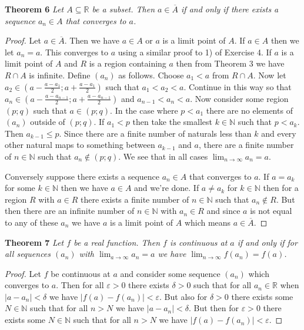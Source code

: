 \documentclass{article}
\begin{document}
\begin{flushleft}
\textbf{Theorem 6}
\textsl{Let $A \subseteq \mathbb{R}$ be a subset. Then $a \in \overline{A}$ if and only if there exists a sequence $a_n \in A$ that converges to $a$.}
\begin{proof}
Let $a \in \overline{A}$. Then we have $a \in A$ or $a$ is a limit point of $A$. If $a \in A$ then we let $a_n = a$. This converges to $a$ using a similar proof to 1) of Exercise 4. If $a$ is a limit point of $A$ and $R$ is a region containing $a$ then from Theorem 3 we have $R \cap A$ is infinite. Define $(a_n)$ as follows. Choose $a_1 < a$ from $R \cap A$. Now let $a_2 \in (a - \frac{a-a_1}{2} ; a + \frac{a - a_1}{2})$ such that $a_1 < a_2 < a$. Continue in this way so that $a_n \in (a - \frac{a-a_{n-1}}{2} ; a + \frac{a-a_{n-1}}{2})$ and $a_{n-1} < a_n < a$. Now consider some region $(p;q)$ such that $a \in (p;q)$. In the case where $p<a_1$ there are no elements of $(a_n)$ outside of $(p;q)$. If $a_1 < p$ then take the smallest $k \in \mathbb{N}$ such that $p<a_k$. Then $a_{k-1} \leq p$. Since there are a finite number of naturals less than $k$ and every other natural maps to something between $a_{k-1}$ and $a$, there are a finite number of $n \in \mathbb{N}$ such that $a_n \notin (p;q)$. We see that in all cases $\lim_{n \rightarrow \infty} a_n = a$.\newline

Conversely suppose there exists a sequence $a_n \in A$ that converges to $a$. If $a=a_k$ for some $k \in \mathbb{N}$ then we have $a \in A$ and we're done. If $a \neq a_k$ for $k \in \mathbb{N}$ then for a region $R$ with $a \in R$ there exists a finite number of $n \in \mathbb{N}$ such that $a_n \notin R$. But then there are an infinite number of $n \in \mathbb{N}$ with $a_n \in R$ and since $a$ is not equal to any of these $a_n$ we have $a$ is a limit point of $A$ which means $a \in \overline{A}$.
\end{proof}

\textbf{Theorem 7}
\textsl{Let $f$ be a real function. Then $f$ is continuous at $a$ if and only if for all sequences $(a_n)$ with $\lim_{a \rightarrow \infty} a_n = a$ we have $\lim_{n \rightarrow \infty} f(a_n) = f(a)$.}
\begin{proof}
Let $f$ be continuous at $a$ and consider some sequence $(a_n)$ which converges to $a$. Then for all $\varepsilon > 0$ there exists $\delta > 0$ such that for all $a_n \in \mathbb{R}$ when $|a-a_n| < \delta$ we have $|f(a) - f(a_n)| < \varepsilon$. But also for $\delta > 0$ there exists some $N \in \mathbb{N}$ such that for all $n > N$ we have $|a-a_n| < \delta$. But then for $\varepsilon > 0$ there exists some $N \in \mathbb{N}$ such that for all $n>N$ we have $|f(a) - f(a_n)| < \varepsilon$.\newline


\end{proof}
\end{flushleft}
\end{document}
